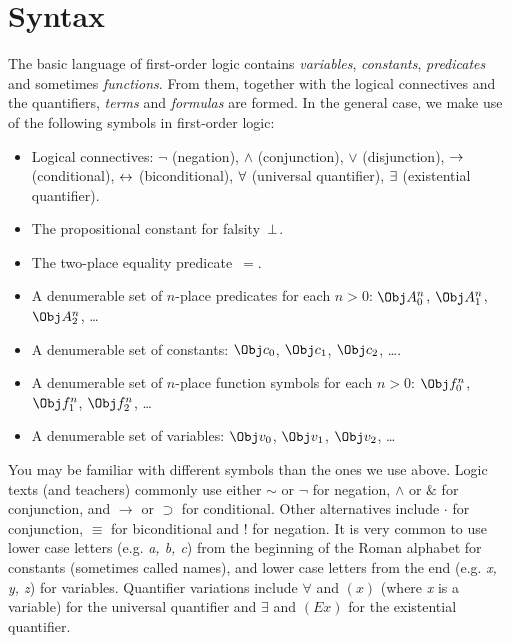 \documentclass[syntax-and-semantics]{subfiles}
\begin{document}
\section{Syntax}


The basic language of first-order logic contains \emph{variables}, \emph{constants}, \emph{predicates} and sometimes \emph{functions}.  From them, together with the logical connectives and the quantifiers, \emph{terms} and \emph{formulas} are formed.  In the general case, we make use of the following symbols in first-order logic:

\begin{itemize}
\item Logical connectives: $\lnot$ (negation), $\land$ (conjunction), $\lor$ (disjunction), $\to$ (conditional), $\leftrightarrow$ (biconditional), $\lforall$ (universal quantifier), $\lexists$ (existential quantifier).
\item The propositional constant for falsity~$\bot$.
\item The two-place equality predicate~$=$.
\item A denumerable set of $n$-place predicates for each $n>0$: $\Obj A^n_0$, $\Obj A^n_1$, $\Obj A^n_2$, \dots
\item A denumerable set of constants: $\Obj c_0$, $\Obj c_1$, $\Obj c_2$, \dots.
\item A denumerable set of $n$-place function symbols for each $n>0$: $\Obj f^n_0$, $\Obj f^n_1$, $\Obj f^n_2$, \dots
\item A denumerable set of variables: $\Obj v_0$, $\Obj v_1$, $\Obj v_2$, \dots
\end{itemize}


You may be familiar with different symbols than the ones we use above. Logic texts (and teachers) commonly use either $\sim$ or $\neg$ for negation, $\wedge$ or $\&$ for conjunction, and $\rightarrow$ or $\supset$ for conditional. Other alternatives include $\cdot$ for conjunction, $\equiv$ for biconditional and ! for negation. It is very common to use lower case letters (e.g. \textit{a, b, c}) from the beginning of the Roman alphabet for constants (sometimes called names), and lower case letters from the end (e.g. \textit{x, y, z}) for variables. Quantifier variations include $\forall$ and $(x)$ (where \textit{x} is a variable) for the universal quantifier and $\exists$ and $(Ex)$ for the existential quantifier.
\end{document}
